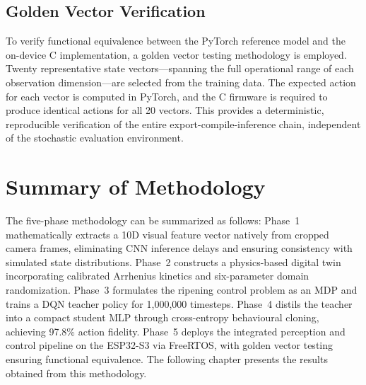     \subsection{Golden Vector Verification}

    To verify functional equivalence between the PyTorch reference model and the on-device C implementation, a golden vector testing methodology is employed. Twenty representative state vectors---spanning the full operational range of each observation dimension---are selected from the training data. The expected action for each vector is computed in PyTorch, and the C firmware is required to produce identical actions for all 20 vectors. This provides a deterministic, reproducible verification of the entire export-compile-inference chain, independent of the stochastic evaluation environment.



\section{Summary of Methodology}
    \label{sec:Methodology Summary}

    The five-phase methodology can be summarized as follows: Phase~1 mathematically extracts a 10D visual feature vector natively from cropped camera frames, eliminating CNN inference delays and ensuring consistency with simulated state distributions. Phase~2 constructs a physics-based digital twin incorporating calibrated Arrhenius kinetics and six-parameter domain randomization. Phase~3 formulates the ripening control problem as an MDP and trains a DQN teacher policy for 1,000,000 timesteps. Phase~4 distils the teacher into a compact student MLP through cross-entropy behavioural cloning, achieving 97.8\% action fidelity. Phase~5 deploys the integrated perception and control pipeline on the ESP32-S3 via FreeRTOS, with golden vector testing ensuring functional equivalence. The following chapter presents the results obtained from this methodology.
